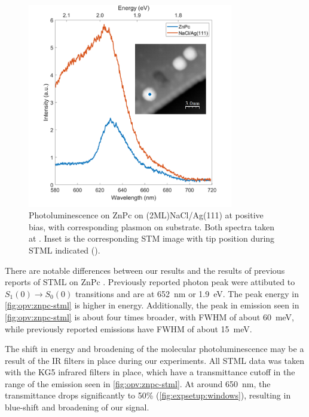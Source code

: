 \begin{figure} [H]
    \centering
    \includegraphics[width=0.8\textwidth]{pictures/znpc_+ve_emission_inset.png}
    \caption{Photoluminescence on ZnPc on (2ML)NaCl/Ag(111) at positive bias, with corresponding plasmon on substrate. Both spectra taken at . Inset is the corresponding STM image with tip position during STML indicated (). }
    \label{fig:opv:znpc-stml}
\end{figure}

There are notable differences between our results and the results of previous reports of \ac{STML} on ZnPc \citep{Zhang2016, Doppagne2017, Zhang2017, Doppagne2018}. Previously reported photon peak were attibuted to $S_1(0) \rightarrow S_0(0)$ transitions and are at \SI{652}{nm} or \SI{1.9}{eV}. The peak energy in \autoref{fig:opv:znpc-stml} is higher in energy. Additionally, the peak in emission seen in \autoref{fig:opv:znpc-stml} is about four times broader, with \ac{FWHM} of about \SI{60}{meV}, while previously reported emissions have \ac{FWHM} of about \SI{15}{meV}.

The shift in energy and broadening of the molecular photoluminescence may be a result of the IR filters in place during our experiments. All \ac{STML} data was taken with the KG5 infrared filters in place, which have a transmittance cutoff in the range of the emission seen in \autoref{fig:opv:znpc-stml}. At around \SI{650}{nm}, the transmittance drops significantly to 50\% (\autoref{fig:expsetup:windows}), resulting in blue-shift and broadening of our signal. 

